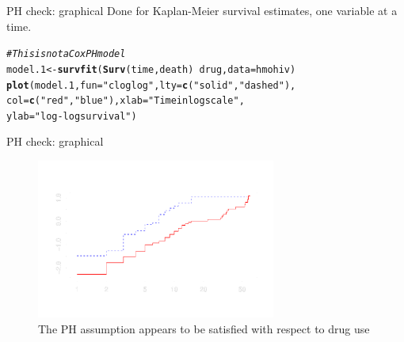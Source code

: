 \documentclass[12pt,english,pdf,xcolor=dvipsnames,aspectratio=169,handout]{beamer}\usepackage[]{graphicx}\usepackage[]{xcolor}
\makeatletter
\newcommand{\hlstr}[1]{\textcolor[rgb]{0.192,0.494,0.8}{#1}}%
\newcommand{\hlcom}[1]{\textcolor[rgb]{0.678,0.584,0.686}{\textit{#1}}}%
\newcommand{\hlopt}[1]{\textcolor[rgb]{0,0,0}{#1}}%
\newcommand{\hlstd}[1]{\textcolor[rgb]{0.345,0.345,0.345}{#1}}%
\newcommand{\hlkwb}[1]{\textcolor[rgb]{0.69,0.353,0.396}{#1}}%
\newcommand{\hlkwc}[1]{\textcolor[rgb]{0.333,0.667,0.333}{#1}}%
\newcommand{\hlkwd}[1]{\textcolor[rgb]{0.737,0.353,0.396}{\textbf{#1}}}%
\newenvironment{kframe}{%
 \def\at@end@of@kframe{}%
 \ifinner\ifhmode%
  \def\at@end@of@kframe{\end{minipage}}%
  \begin{minipage}{\columnwidth}%
 \fi\fi%
 \def\FrameCommand##1{\hskip\@totalleftmargin \hskip-\fboxsep
 \colorbox{shadecolor}{##1}\hskip-\fboxsep
     \hskip-\linewidth \hskip-\@totalleftmargin \hskip\columnwidth}%
 \MakeFramed {\advance\hsize-\width
   \@totalleftmargin\z@ \linewidth\hsize
   \@setminipage}}%
 {\par\unskip\endMakeFramed%
 \at@end@of@kframe}
\newenvironment{knitrout}{}{} %
\makeatother
\begin{document}
\begin{frame}[fragile]{PH check: graphical}
Done for Kaplan-Meier survival estimates, one variable at a time.\bigskip

\begin{knitrout}\scriptsize
{}\color{fgcolor}\begin{kframe}
\begin{alltt}
\hlcom{# This is not a Cox PH model}
\hlstd{model.1} \hlkwb{<-} \hlkwd{survfit}\hlstd{(}\hlkwd{Surv}\hlstd{(time, death)} \hlopt{~} \hlstd{drug,} \hlkwc{data} \hlstd{= hmohiv)}
\hlkwd{plot}\hlstd{(model.1,} \hlkwc{fun} \hlstd{=} \hlstr{"cloglog"}\hlstd{,} \hlkwc{lty} \hlstd{=} \hlkwd{c}\hlstd{(}\hlstr{"solid"}\hlstd{,} \hlstr{"dashed"}\hlstd{),}
     \hlkwc{col} \hlstd{=} \hlkwd{c}\hlstd{(}\hlstr{"red"}\hlstd{,} \hlstr{"blue"}\hlstd{),} \hlkwc{xlab} \hlstd{=} \hlstr{"Time in log scale"}\hlstd{,}
     \hlkwc{ylab} \hlstd{=} \hlstr{"log-log survival"}\hlstd{)}
\end{alltt}
\end{kframe}
\end{knitrout}



\end{frame}



\begin{frame}[fragile]{PH check: graphical}

\begin{figure}
\centering
\includegraphics[width=0.7\textwidth]{../03-graphs/02-05.pdf}
\caption*{The PH assumption appears to be satisfied with respect to drug use}
\end{figure}
\end{frame}
\end{document}
